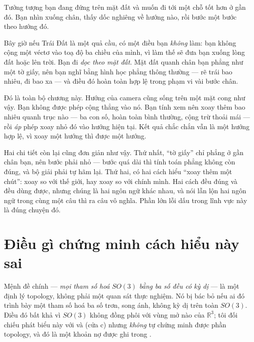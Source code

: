\documentclass[../../vslam.tex]{subfiles}
\begin{document}
\begin{dongian}
Tưởng tượng bạn đang đứng trên mặt đất và muốn đi tới một chỗ tốt hơn ở gần đó. Bạn nhìn xuống chân, thấy dốc nghiêng về hướng nào, rồi bước một bước theo hướng đó.

Bây giờ nếu Trái Đất là một quả cầu, có một điều bạn \emph{không} làm: bạn không cộng một véctơ vào toạ độ ba chiều của mình, vì làm thế sẽ đưa bạn xuống lòng đất hoặc lên trời. Bạn đi \emph{dọc theo mặt đất}. Mặt đất quanh chân bạn phẳng như một tờ giấy, nên bạn nghĩ bằng hình học phẳng thông thường --- rẽ trái bao nhiêu, đi bao xa --- và điều đó hoàn toàn hợp lệ trong phạm vi vài bước chân.

Đó là toàn bộ chương này. Hướng của camera cũng sống trên một mặt cong như vậy. Bạn không được phép cộng thẳng vào nó. Bạn tính xem nên xoay thêm bao nhiêu quanh trục nào --- ba con số, hoàn toàn bình thường, cộng trừ thoải mái --- rồi \emph{áp} phép xoay nhỏ đó vào hướng hiện tại. Kết quả chắc chắn vẫn là một hướng hợp lệ, vì xoay một hướng thì được một hướng.

Hai chi tiết còn lại cũng đơn giản như vậy. Thứ nhất, ``tờ giấy'' chỉ phẳng ở gần chân bạn, nên bước phải nhỏ --- bước quá dài thì tính toán phẳng không còn đúng, và bộ giải phải tự hãm lại. Thứ hai, có hai cách hiểu ``xoay thêm một chút'': xoay so với thế giới, hay xoay so với chính mình. Hai cách đều đúng và đều dùng được, nhưng chúng là hai ngôn ngữ khác nhau, và nói lẫn lộn hai ngôn ngữ trong cùng một câu thì ra câu vô nghĩa. Phần lớn lỗi dấu trong lĩnh vực này là đúng chuyện đó.

\end{dongian}

\section{Điều gì chứng minh cách hiểu này sai}

Mệnh đề chính --- \emph{mọi tham số hoá \(SO(3)\) bằng ba số đều có kỳ dị} --- là một định lý topology, không phải một quan sát thực nghiệm. Nó bị bác bỏ nếu ai đó trình bày một tham số hoá ba số trơn, song ánh, không kỳ dị trên toàn \(SO(3)\). Điều đó bất khả vì \(SO(3)\) không đồng phôi với vùng mở nào của \(\mathbb{R}^3\); tôi đối chiếu phát biểu này với \cite{sola2018microlie} và \cite{barfoot2017} (cửa c) nhưng \emph{không} tự chứng minh được phần topology, và đó là một khoản nợ được ghi trong .
\end{document}

